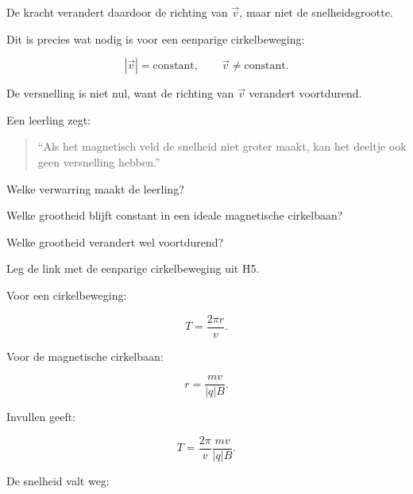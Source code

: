 \documentclass{ximera}
\begin{document}
De kracht verandert daardoor de richting van $\vec v$, maar niet de
snelheidsgrootte.

Dit is precies wat nodig is voor een eenparige cirkelbeweging:

\[
|\vec v|=\text{constant},
\qquad
\vec v\neq\text{constant}.
\]

De versnelling is niet nul, want de richting van $\vec v$ verandert
voortdurend.

\begin{oefening}{\oefU}

Een leerling zegt:

\begin{quote}
``Als het magnetisch veld de snelheid niet groter maakt, kan het deeltje
ook geen versnelling hebben.''
\end{quote}

\begin{question}
Welke verwarring maakt de leerling?
\end{question}

\begin{question}
Welke grootheid blijft constant in een ideale magnetische cirkelbaan?
\end{question}

\begin{question}
Welke grootheid verandert wel voortdurend?
\end{question}

\begin{question}
Leg de link met de eenparige cirkelbeweging uit H5.
\end{question}

\end{oefening}




Voor een cirkelbeweging:

\[
T=\frac{2\pi r}{v}.
\]

Voor de magnetische cirkelbaan:

\[
r=\frac{mv}{|q|B}.
\]

Invullen geeft:

\[
T
=
\frac{2\pi}{v}
\frac{mv}{|q|B}.
\]

De snelheid valt weg:
\end{document}
